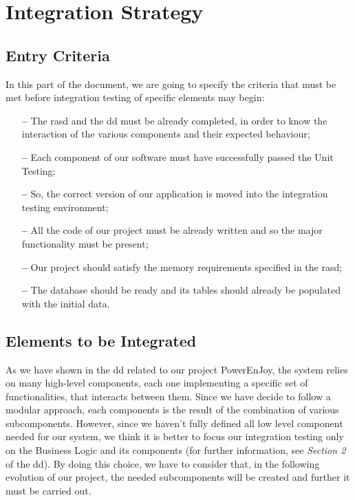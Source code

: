 \section{Integration Strategy} \label{sec:intstra}

\subsection{Entry Criteria}

In this part of the document, we are going to specify the criteria that must be met before integration testing of specific elements may begin:

\begin{itemize}

\item[\textbf{--}] The \acl{rasd} and the \acl{dd} must be already completed, in order to know the interaction of the various components and their expected behaviour;

\item[\textbf{--}] Each component of our software must have successfully passed the Unit Testing;

\item[\textbf{--}] So, the correct version of our application is moved into the integration testing environment;

\item[\textbf{--}] All the code of our project must be already written and so the major functionality must be present;

\item[\textbf{--}] Our project should satisfy the memory requirements specified in the \acs{rasd};

\item[\textbf{--}] The database should be ready and its tables should already be populated with the initial data.

\end{itemize}

\subsection{Elements to be Integrated}

As we have shown in the \acl{dd} related to our project PowerEnJoy, the system relies on many high-level components, each one implementing a specific set of functionalities, that interacts between them.
Since we have decide to follow a modular approach, each components is the result of the combination of various subcomponents.
However, since we haven't fully defined all low level component needed for our system, we think it is better to focus our integration testing only on the Business Logic and its components (for further information, see \textit{Section 2} of the \acl{dd}). By doing this choice, we have to consider that, in the following evolution of our project, the needed subcomponents will be created and further \acl{it} must be carried out.
 
